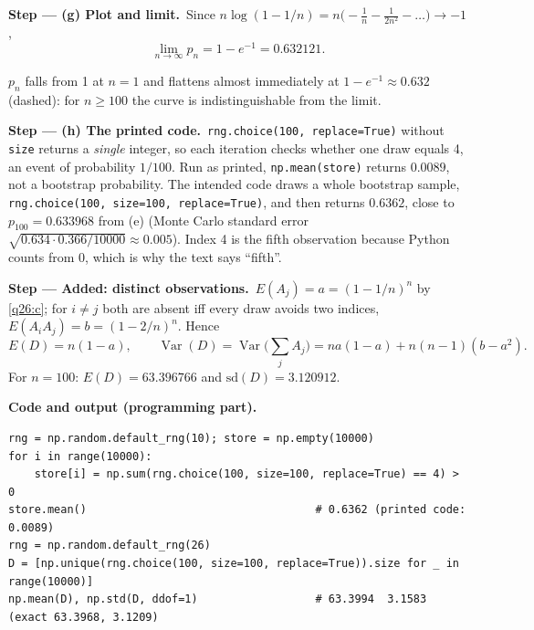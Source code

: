 \documentclass[11pt,a4paper]{article}
\numberwithin{equation}{questao}   %
\newcommand{\passo}[2]{\par\smallskip\noindent\textbf{Step --- #1.}~#2}
\newcommand{\codehead}{\par\smallskip\noindent\textbf{Code and output (programming part).}\par}
\newcommand{\Var}{\operatorname{Var}}
\newcommand{\1}{\mathbf{1}}
\begin{document}
\begin{sol}
\passo{(g) Plot and limit}{Since $n\log(1-1/n)=n\big(-\tfrac1n-\tfrac1{2n^2}-\dots\big)\to-1$,}
\begin{equation}\label{q26:lim}
\lim_{n\to\infty}p_n=1-e^{-1}=0.632121 .
\end{equation}
\begin{center}
\end{center}
$p_n$ falls from 1 at $n=1$ and flattens almost immediately at $1-e^{-1}\approx0.632$ (dashed): for
$n\ge100$ the curve is indistinguishable from the limit.

\passo{(h) The printed code}{\texttt{rng.choice(100, replace=True)} without \texttt{size} returns a
\emph{single} integer, so each iteration checks whether one draw equals 4, an event of probability
$1/100$. Run as printed, \texttt{np.mean(store)} returns $0.0089$, not a bootstrap probability. The
intended code draws a whole bootstrap sample, \texttt{rng.choice(100, size=100, replace=True)},
and then returns $0.6362$, close to $p_{100}=0.633968$ from (e) (Monte Carlo standard error
$\sqrt{0.634\cdot0.366/10000}\approx0.005$). Index 4 is the fifth observation because Python
counts from 0, which is why the text says ``fifth''.}

\passo{Added: distinct observations}{$E(A_j)=a=(1-1/n)^n$ by \eqref{q26:c}; for $i\ne j$ both are
absent iff every draw avoids two indices, $E(A_iA_j)=b=(1-2/n)^n$. Hence}
\begin{equation}\label{q26:D}
E(D)=n(1-a),\qquad \Var(D)=\Var\Big(\sum_jA_j\Big)=na(1-a)+n(n-1)(b-a^2).
\end{equation}
For $n=100$: $E(D)=63.396766$ and $\mathrm{sd}(D)=3.120912$.

\codehead
{\small
\begin{verbatim}
rng = np.random.default_rng(10); store = np.empty(10000)
for i in range(10000):
    store[i] = np.sum(rng.choice(100, size=100, replace=True) == 4) > 0
store.mean()                                   # 0.6362 (printed code: 0.0089)
rng = np.random.default_rng(26)
D = [np.unique(rng.choice(100, size=100, replace=True)).size for _ in range(10000)]
np.mean(D), np.std(D, ddof=1)                  # 63.3994  3.1583  (exact 63.3968, 3.1209)
\end{verbatim}
}


\end{sol}
\end{document}
